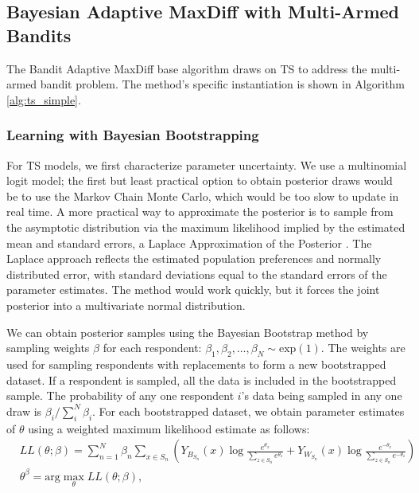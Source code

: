 \documentclass[a4paper,11pt]{article}
\begin{document}

\subsection{Bayesian Adaptive MaxDiff with Multi-Armed Bandits}

The Bandit Adaptive MaxDiff base algorithm draws on TS to address the multi-armed bandit problem. The method's specific instantiation is shown in Algorithm \ref{alg:ts_simple}.
  
\subsubsection{Learning with Bayesian Bootstrapping}

For TS models, we first characterize parameter uncertainty. We use a multinomial logit model; the first but least practical option to obtain posterior draws would be to use the Markov Chain Monte Carlo, which would be too slow to update in real time. A more practical way to approximate the posterior is to sample from the asymptotic distribution via the maximum likelihood implied by the estimated mean and standard errors, a Laplace Approximation of the Posterior \citep{tierney1986accurate}. The Laplace approach reflects the estimated population preferences and normally distributed error, with standard deviations equal to the standard errors of the parameter estimates. The method would work quickly, but it forces the joint posterior into a multivariate normal distribution. 

We can obtain posterior samples using the Bayesian Bootstrap method by sampling weights $\beta$ for each respondent: $\beta_1,\beta_2,\ldots,\beta_N \sim \text{exp}(1)$. The weights are used for sampling respondents with replacements to form a new bootstrapped dataset. If a respondent is sampled, all the data is included in the bootstrapped sample. The probability of any one respondent $i$'s data being sampled in any one draw is $\beta_i / \sum_{i}^{N}\beta_i$.  For each bootstrapped dataset, we obtain parameter estimates of $\theta$ using a weighted  maximum likelihood estimate as follows:
\begin{align}
&LL(\theta;\beta)=\sum_{n=1}^N \beta_n
\sum_{x \in S_n} 
	\left(
		Y_{B_{S_n}}(x)
		\log{\frac{e^{\theta_x}}{\sum_{z\in S_n} e^{\theta_z}}} 
		+ 
		Y_{W_{S_n}}(x)
		\log{\frac{e^{-\theta_x}}{\sum_{z\in S_n} e^{-\theta_z}}}
	\right) \\
&\theta^\beta = \text{arg}\max_{\theta} LL(\theta;\beta) ,
\end{align}
\end{document}
